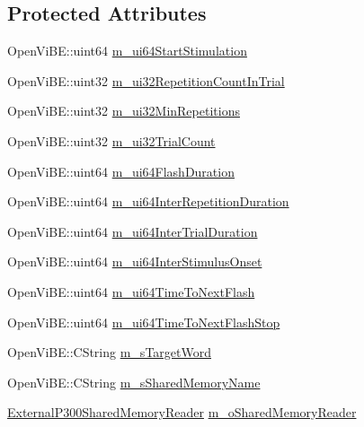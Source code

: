 \subsection*{Protected Attributes}
\begin{DoxyCompactItemize}
\item 
OpenViBE::uint64 \hyperlink{classOpenViBEApplications_1_1ExternalP300Stimulator_a871dfba073536bf09e4902b4ae9eeca4}{m\_\-ui64StartStimulation}
\item 
OpenViBE::uint32 \hyperlink{classOpenViBEApplications_1_1ExternalP300Stimulator_a52cdf161b3ba910eca0034f0d6bdf7f3}{m\_\-ui32RepetitionCountInTrial}
\item 
OpenViBE::uint32 \hyperlink{classOpenViBEApplications_1_1ExternalP300Stimulator_a626249eb5fcbb8d0af729b66b89528db}{m\_\-ui32MinRepetitions}
\item 
OpenViBE::uint32 \hyperlink{classOpenViBEApplications_1_1ExternalP300Stimulator_a696e222e0bc0292bf3e811b130d79d42}{m\_\-ui32TrialCount}
\item 
OpenViBE::uint64 \hyperlink{classOpenViBEApplications_1_1ExternalP300Stimulator_a89bd19ecb85005fa0d2ce8deabf6caf6}{m\_\-ui64FlashDuration}
\item 
OpenViBE::uint64 \hyperlink{classOpenViBEApplications_1_1ExternalP300Stimulator_a5b583cf54ba554e137dbf8a5b48048fd}{m\_\-ui64InterRepetitionDuration}
\item 
OpenViBE::uint64 \hyperlink{classOpenViBEApplications_1_1ExternalP300Stimulator_ada30d8ac580689af5d1f5d7dc1b097a7}{m\_\-ui64InterTrialDuration}
\item 
OpenViBE::uint64 \hyperlink{classOpenViBEApplications_1_1ExternalP300Stimulator_ae496cb0f16c90bd8c5ed48e7bc2a49aa}{m\_\-ui64InterStimulusOnset}
\item 
OpenViBE::uint64 \hyperlink{classOpenViBEApplications_1_1ExternalP300Stimulator_a81dbc2140291b63414a1285c40489dd0}{m\_\-ui64TimeToNextFlash}
\item 
OpenViBE::uint64 \hyperlink{classOpenViBEApplications_1_1ExternalP300Stimulator_ae8a99207220ec821a363c89c020cc423}{m\_\-ui64TimeToNextFlashStop}
\item 
OpenViBE::CString \hyperlink{classOpenViBEApplications_1_1ExternalP300Stimulator_ab1aa149d179bf25dc1f871a610be037e}{m\_\-sTargetWord}
\item 
OpenViBE::CString \hyperlink{classOpenViBEApplications_1_1ExternalP300Stimulator_a2028493f71b723c90bcfca9dbef5d402}{m\_\-sSharedMemoryName}
\item 
\hyperlink{classOpenViBEApplications_1_1ExternalP300SharedMemoryReader}{ExternalP300SharedMemoryReader} \hyperlink{classOpenViBEApplications_1_1ExternalP300Stimulator_abe950efc693737f95ac1dfef3cb5da7f}{m\_\-oSharedMemoryReader}

\end{DoxyCompactItemize}
